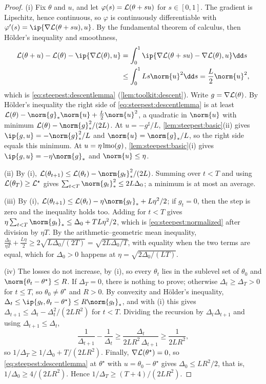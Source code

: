 \begin{refsection}
\begin{proof}
(i) Fix $\theta$ and $u$, and let $\varphi(s)=\mathcal{L}(\theta+su)$ for $s\in[0,1]$. The gradient is Lipschitz, hence continuous, so $\varphi$ is continuously differentiable with $\varphi'(s)=\ip{\nabla\Loss(\theta+su),u}$. By the fundamental theorem of calculus, then Hölder's inequality and smoothness,
\[
\begin{aligned}
  \Loss(\theta+u)-\Loss(\theta)-\ip{\nabla\Loss(\theta),u}&=\int_0^1\ip{\nabla\Loss(\theta+su)-\nabla\Loss(\theta),u}\dd s\\
  &\le\int_0^1Ls\norm{u}^2\dd s=\frac L2\norm{u}^2,
\end{aligned}
\]
which is \eqref{eq:steepest:descentlemma} (\cref{lem:toolkit:descent}). Write $g=\nabla\mathcal{L}(\theta)$. By Hölder's inequality the right side of \eqref{eq:steepest:descentlemma} is at least $\Loss(\theta)-\norm{g}_*\norm{u}+\frac L2\norm{u}^2$, a quadratic in $\norm{u}$ with minimum $\Loss(\theta)-\norm{g}_*^2/(2L)$. At $u=-g^\sharp/L$, \cref{lem:steepest:basic}(ii) gives $\ip{g,u}=-\norm{g}_*^2/L$ and $\norm{u}=\norm{g}_*/L$, so the right side equals this minimum. At $u=\eta\operatorname{lmo}(g)$, \cref{lem:steepest:basic}(i) gives $\ip{g,u}=-\eta\norm{g}_*$ and $\norm{u}\le\eta$.

(ii) By (i), $\Loss(\theta_{t+1})\le\Loss(\theta_t)-\norm{g_t}_*^2/(2L)$. Summing over $t<T$ and using $\mathcal{L}(\theta_T)\ge\mathcal{L}^\star$ gives $\sum_{t<T}\norm{g_t}_*^2\le2L\Delta_0$; a minimum is at most an average.

(iii) By (i), $\Loss(\theta_{t+1})\le\Loss(\theta_t)-\eta\norm{g_t}_*+L\eta^2/2$; if $g_t=0$, then the step is zero and the inequality holds too. Adding for $t<T$ gives $\eta\sum_{t<T}\norm{g_t}_*\le\Delta_0+TL\eta^2/2$, which is \eqref{eq:steepest:normalized} after division by $\eta T$. By the arithmetic--geometric mean inequality, $\frac{\Delta_0}{\eta T}+\frac{L\eta}2\ge2\sqrt{L\Delta_0/(2T)}=\sqrt{2L\Delta_0/T}$, with equality when the two terms are equal, which for $\Delta_0>0$ happens at $\eta=\sqrt{2\Delta_0/(LT)}$.

(iv) The losses do not increase, by (i), so every $\theta_t$ lies in the sublevel set of $\theta_0$ and $\norm{\theta_t-\theta^\star}\le R$. If $\Delta_T=0$, there is nothing to prove; otherwise $\Delta_t\ge\Delta_T>0$ for $t\le T$, so $\theta_0\ne\theta^\star$ and $R>0$. By convexity and Hölder's inequality, $\Delta_t\le\ip{g_t,\theta_t-\theta^\star}\le R\norm{g_t}_*$, and with (i) this gives $\Delta_{t+1}\le\Delta_t-\Delta_t^2/(2LR^2)$ for $t<T$. Dividing the recursion by $\Delta_t\Delta_{t+1}$ and using $\Delta_{t+1}\le\Delta_t$,
\[
  \frac1{\Delta_{t+1}}-\frac1{\Delta_t}\ge\frac{\Delta_t}{2LR^2\,\Delta_{t+1}}\ge\frac1{2LR^2},
\]
so $1/\Delta_T\ge1/\Delta_0+T/(2LR^2)$. Finally, $\nabla\mathcal{L}(\theta^\star)=0$, so \eqref{eq:steepest:descentlemma} at $\theta^\star$ with $u=\theta_0-\theta^\star$ gives $\Delta_0\le LR^2/2$, that is, $1/\Delta_0\ge4/(2LR^2)$. Hence $1/\Delta_T\ge(T+4)/(2LR^2)$.
\end{proof}


\end{refsection}
